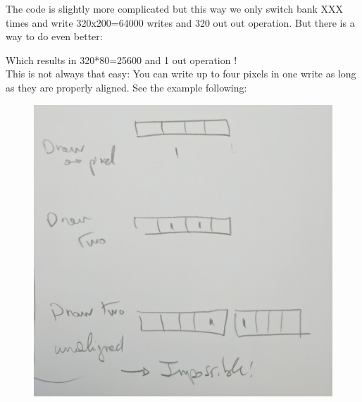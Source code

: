 

The code is slightly more complicated but this way we only switch bank XXX times and write 320x200=64000 writes and  320 out out operation. But there is a way to do even better: 



Which results in 320*80=25600 and 1 out operation !\\

This is not always that easy: You can write up to four pixels in one write as long as they are properly aligned. See the example following:
\begin{figure}[H]
  \centering
 \includegraphics[scale=0.3]{imgs//vga_multiple_pixel_write.png}
\end{figure}





















  
  
